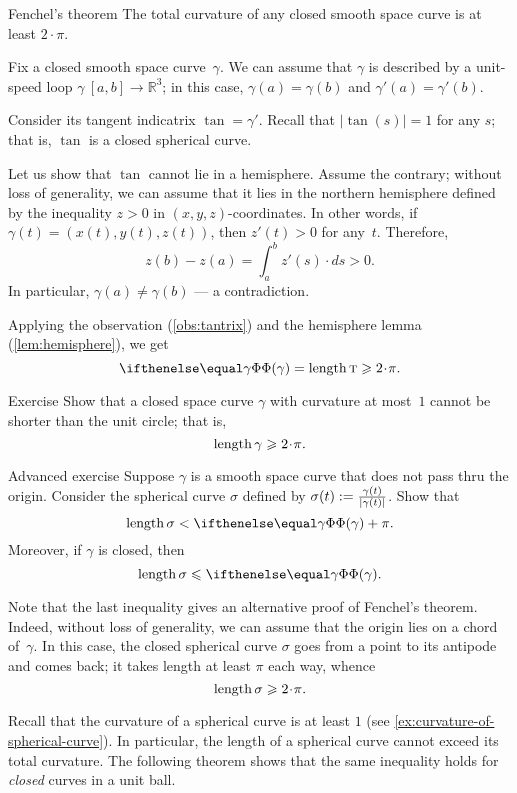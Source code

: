 \begin{thm}{Fenchel's theorem}
\label{thm:fenchel}
The total curvature of any closed smooth space curve is at least $2\cdot\pi$.
\end{thm}

Fix a closed smooth space curve~$\gamma$.
We can assume that $\gamma$ is described by a unit-speed loop $\gamma\:[a,b]\to \mathbb{R}^3$;
in this case, $\gamma(a)=\gamma(b)$ and $\gamma'(a)=\gamma'(b)$.

Consider its tangent indicatrix $\tan=\gamma'$.
Recall that $|\tan(s)|=1$ for any $s$; that is, $\tan$ is a closed spherical curve.

Let us show that $\tan$ cannot lie in a hemisphere.
Assume the contrary; without loss of generality, we can assume that it lies in the northern hemisphere defined by the inequality $z>0$ in $(x,y,z)$-coordinates.
In other words, if $\gamma(t)=(x(t), y(t), z(t))$, then $z'(t)>0$ for any~$t$.
Therefore,
\[z(b)-z(a)=\int_a^b z'(s)\cdot ds>0.\]
In particular, $\gamma(a)\ne \gamma(b)$ --- a contradiction.

Applying the observation (\ref{obs:tantrix}) and the hemisphere lemma (\ref{lem:hemisphere}), we get  
\[\tc\gamma=\length \tan\ge2\cdot\pi.\]
\qedsf

\begin{thm}{Exercise}\label{ex:length>=2pi}
Show that a closed space curve $\gamma$ with curvature at most~$1$ cannot be shorter than the unit circle;
that is, 
\[\length\gamma\ge 2\cdot \pi.\]

\end{thm}


\begin{thm}{Advanced exercise}\label{ex:gamma/|gamma|}
Suppose $\gamma$ is a smooth space curve that does not pass thru the origin.
Consider the spherical curve $\sigma$ defined by $\sigma(t)\z\df\frac{\gamma(t)}{|\gamma(t)|}$.
Show that 
\[\length \sigma< \tc\gamma+\pi.\]
Moreover, if $\gamma$ is closed, then
\[\length \sigma\le \tc\gamma.\]
\end{thm}

Note that the last inequality gives an alternative proof of Fenchel's theorem.
Indeed, without loss of generality, we can assume that the origin lies on a chord of~$\gamma$.
In this case, the closed spherical curve $\sigma$ goes from a point to its antipode and comes back; 
it takes length at least $\pi$ each way, 
whence 
\[\length\sigma\ge 2\cdot\pi.\]

Recall that the curvature of a spherical curve is at least $1$
(see \ref{ex:curvature-of-spherical-curve}).
In particular, the length of a spherical curve cannot exceed its total curvature.
The following theorem shows that the same inequality holds for \textit{closed} curves in a unit ball.


